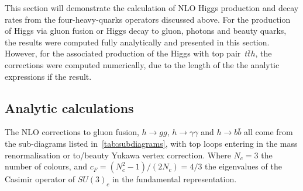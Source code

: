 This section will demonstrate the calculation of NLO Higgs production and decay rates from the four-heavy-quarks operators discussed above. For the production of Higgs via gluon fusion or Higgs decay to gluon, photons and beauty quarks, the results were computed fully analytically and presented in this section. However, for the associated production of the Higgs with top pair~$ t\bar{t} h$, the corrections were computed numerically, due to the length of the the analytic expressions if the result.

\subsection{Analytic calculations}
\par The NLO corrections to gluon fusion, $h \to gg$, $h\to \gamma \gamma$ and $ h \to b \bar{b}$ all come from the sub-diagrams listed in~\autoref{tab:subdiagrams}, with top loops entering in the mass renormalisation or to/beauty Yukawa vertex correction. Where $N_c=3$ the number of colours, and $c_F=(N_c^2-1)/(2N_c)=4/3$ the eigenvalues of the Casimir operator of $SU(3)_c$ in the fundamental representation. 
